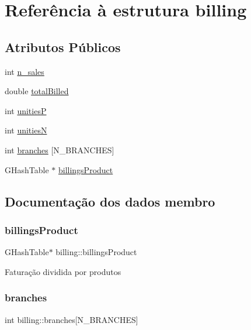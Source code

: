 \hypertarget{structbilling}{}\section{Referência à estrutura billing}
\label{structbilling}
\subsection*{Atributos Públicos}
\begin{DoxyCompactItemize}
\item 
int \hyperlink{structbilling_ab5095dd2fe3537193806daab1f100ad7}{n\+\_\+sales}
\item 
double \hyperlink{structbilling_a655490dfe4f0cb58ead51e0daa2adab9}{total\+Billed}
\item 
int \hyperlink{structbilling_a981ee24625c7cff0c29f320810eeaf52}{unitiesP}
\item 
int \hyperlink{structbilling_ad8370a8b4c4d6511136ae1795fff3ff8}{unitiesN}
\item 
int \hyperlink{structbilling_a5b674133954ae94adcb6d79e2c409d55}{branches} \mbox{[}N\+\_\+\+B\+R\+A\+N\+C\+H\+ES\mbox{]}
\item 
G\+Hash\+Table $\ast$ \hyperlink{structbilling_acbf1f396ac0ef3d3febcaa234414dd9d}{billings\+Product}
\end{DoxyCompactItemize}


\subsection{Documentação dos dados membro}
\mbox{\label{structbilling_acbf1f396ac0ef3d3febcaa234414dd9d}} 
\subsubsection{\texorpdfstring{billings\+Product}{billingsProduct}}
{\footnotesize\ttfamily G\+Hash\+Table$\ast$ billing\+::billings\+Product}

Faturação dividida por produtos \mbox{\label{structbilling_a5b674133954ae94adcb6d79e2c409d55}} 
\subsubsection{\texorpdfstring{branches}{branches}}
{\footnotesize\ttfamily int billing\+::branches\mbox{[}N\+\_\+\+B\+R\+A\+N\+C\+H\+ES\mbox{]}}

